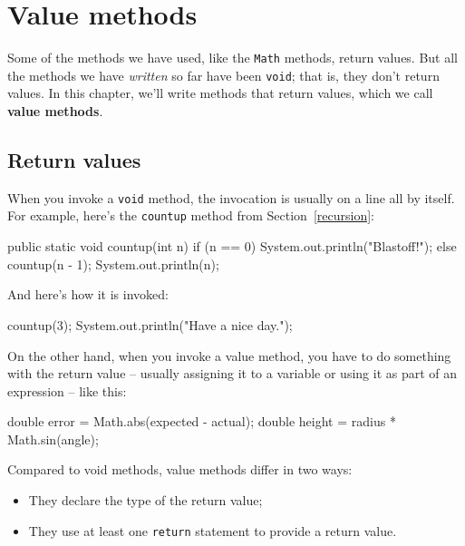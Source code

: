 \documentclass[12pt]{book}
\theoremstyle{exercise}
\newcommand{\java}[1]{\verb"#1"}
\begin{document}
\chapter{Value methods}


Some of the methods we have used, like the \java{Math} methods, return values.
But all the methods we have {\em written} so far have been \java{void}; that is, they don't return values.
In this chapter, we'll write methods that return values, which we call {\bf value methods}.


\section{Return values}


When you invoke a \java{void} method, the invocation is usually on a line all by itself.
For example, here's the \java{countup} method from Section~\ref{recursion}:

\begin{code}
    public static void countup(int n) {
        if (n == 0) {
            System.out.println("Blastoff!");
        } else {
            countup(n - 1);
            System.out.println(n);
        }
    }
\end{code}

And here's how it is invoked:

\begin{code}
    countup(3);
    System.out.println("Have a nice day.");
\end{code}

On the other hand, when you invoke a value method, you have to do something with the return value -- usually assigning it to a variable or using it as part of an expression -- like this:

\begin{code}
    double error = Math.abs(expected - actual);
    double height = radius * Math.sin(angle);
\end{code}


Compared to void methods, value methods differ in two ways:

\begin{itemize}

\item They declare the type of the return value;

\item They use at least one \java{return} statement to provide a return value.

\end{itemize}
\end{document}

